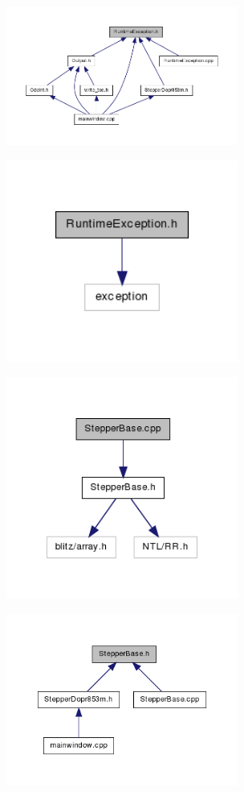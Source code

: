 \includegraphics[width=3in]{figures/_runtime_exception_8h__dep__incl.png}

\includegraphics[width=3in]{figures/_runtime_exception_8h__incl.png}

\includegraphics[width=3in]{figures/_stepper_base_8cpp__incl.png}

\includegraphics[width=3in]{figures/_stepper_base_8h__dep__incl.png}

